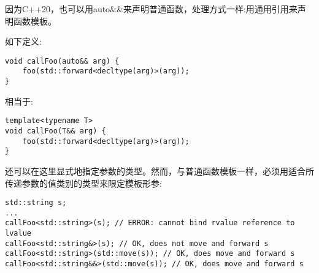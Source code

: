 因为C++20，也可以用auto\&\&来声明普通函数，处理方式一样:用通用引用来声明函数模板。\par

如下定义:\par

\begin{lstlisting}[caption={}]
void callFoo(auto&& arg) {
	foo(std::forward<decltype(arg)>(arg));
}
\end{lstlisting}

相当于:\par

\begin{lstlisting}[caption={}]
template<typename T>
void callFoo(T&& arg) {
	foo(std::forward<decltype(arg)>(arg));
}
\end{lstlisting}

还可以在这里显式地指定参数的类型。然而，与普通函数模板一样，必须用适合所传递参数的值类别的类型来限定模板形参:\par

\begin{lstlisting}[caption={}]
std::string s;
...
callFoo<std::string>(s); // ERROR: cannot bind rvalue reference to lvalue
callFoo<std::string&>(s); // OK, does not move and forward s
callFoo<std::string>(std::move(s)); // OK, does move and forward s
callFoo<std::string&&>(std::move(s)); // OK, does move and forward s
\end{lstlisting}






































